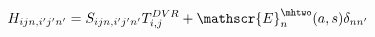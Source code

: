 \begin{equation}
    H_{i j n, i' j' n'}= S_{i j n, i' j' n'} T^{DVR}_{i, j} + \mathscr{E}^{\mhtwo}_{n}(a, s) \delta_{n n'}
\label{eq:coupled_surf_ham}
\end{equation}